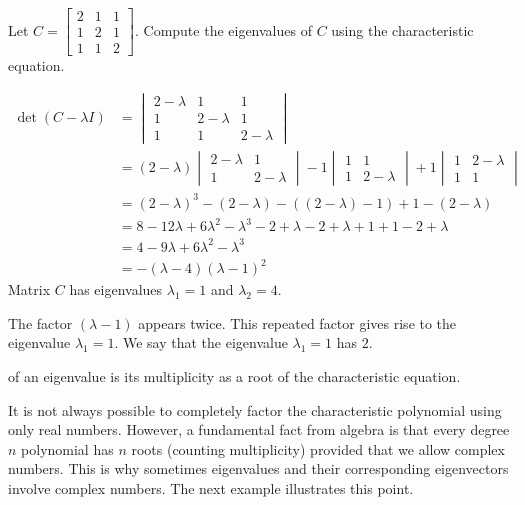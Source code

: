 \documentclass{ximera}
\begin{document}
\begin{example}\label{ex:3x3eig}
Let $C=\begin{bmatrix} 2 & 1 & 1\\ 1 & 2 & 1\\ 1 & 1 & 2\end{bmatrix}$.  Compute the eigenvalues of $C$ using the characteristic equation.
\begin{explanation}
\begin{align*}\det(C-\lambda I)&=\begin{vmatrix}2-\lambda & 1 & 1\\ 1 & 2-\lambda & 1\\ 1 & 1 & 2-\lambda\end{vmatrix}\\
&=(2-\lambda)\begin{vmatrix}2-\lambda&1\\1&2-\lambda\end{vmatrix}-1\begin{vmatrix}1&1\\1&2-\lambda\end{vmatrix}+1\begin{vmatrix}1&2-\lambda\\1&1\end{vmatrix}\\
&=(2-\lambda)^3-(2-\lambda)-((2-\lambda)-1)+1-(2-\lambda)\\
&=8-12\lambda+6\lambda^2-\lambda^3-2+\lambda-2+\lambda+1+1-2+\lambda\\
&=4-9\lambda+6\lambda^2-\lambda^3\\
&=-(\lambda-4)(\lambda-1)^2
\end{align*}
Matrix $C$ has eigenvalues $\lambda_1=1$ and $\lambda_2=4$.

\begin{remark}
    The factor  $(\lambda-1)$ appears twice.  This repeated factor gives rise to the eigenvalue $\lambda_1=1$.  We say that the eigenvalue $\lambda_1=1$ has  $2$.
\end{remark}
\end{explanation}
\end{example}

\begin{definition}\label{def:algMult}
     of an eigenvalue is its multiplicity as a root of the characteristic equation.
\end{definition} 

It is not always possible to completely factor the characteristic polynomial using only real numbers.  However, a fundamental fact from algebra is that every degree $n$ polynomial has $n$ roots (counting multiplicity) provided that we allow complex numbers.  This is why sometimes eigenvalues and their corresponding eigenvectors involve complex numbers.  The next example illustrates this point.
\end{document}

